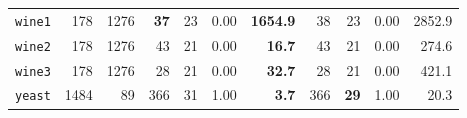 \begin{tabular}{lccrrrrrrrr}
\texttt{wine1} & \multicolumn{1}{r}{178} & \multicolumn{1}{r}{1276}  & \textbf{37} & 23 & 0.00 & \textbf{1654.9} & 38 & 23 & 0.00 & 2852.9\\
\texttt{wine2} & \multicolumn{1}{r}{178} & \multicolumn{1}{r}{1276}  & 43 & 21 & 0.00 & \textbf{16.7} & 43 & 21 & 0.00 & 274.6\\
\texttt{wine3} & \multicolumn{1}{r}{178} & \multicolumn{1}{r}{1276}  & 28 & 21 & 0.00 & \textbf{32.7} & 28 & 21 & 0.00 & 421.1\\
\texttt{yeast} & \multicolumn{1}{r}{1484} & \multicolumn{1}{r}{89}  & 366 & 31 & 1.00 & \textbf{3.7} & 366 & \textbf{29} & 1.00 & 20.3\\
\bottomrule
\end{tabular}
